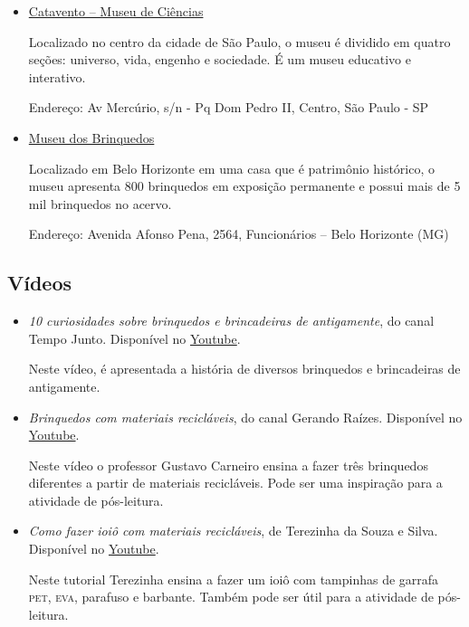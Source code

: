 \documentclass[11pt]{extarticle}
\begin{document}
\begin{itemize}

\item \href{https://museucatavento.org.br/}{Catavento – Museu de Ciências}

Localizado no centro da cidade de São Paulo, o museu é dividido em quatro seções: universo, vida, engenho e sociedade. É um museu educativo e interativo.

Endereço: Av Mercúrio, s/n - Pq Dom Pedro II, Centro, São Paulo - SP

\item \href{http://www.museudosbrinquedos.org.br/}{Museu dos Brinquedos}

Localizado em Belo Horizonte em uma casa que é patrimônio histórico, o museu apresenta 800 brinquedos em exposição permanente e possui mais de 5 mil brinquedos no acervo.

Endereço: Avenida Afonso Pena, 2564, Funcionários – Belo Horizonte (MG)

\end{itemize}

\subsection{Vídeos}

\begin{itemize}

\item \textit{10 curiosidades sobre brinquedos e brincadeiras de antigamente}, do canal Tempo Junto. Disponível no \href{https://www.youtube.com/watch?v=oGzmQm7RZGQ&ab_channel=Tempojunto}{Youtube}. 

Neste vídeo, é apresentada a história de diversos brinquedos e brincadeiras de antigamente.

\item \textit{Brinquedos com materiais recicláveis}, do canal Gerando Raízes. Disponível no \href{https://www.youtube.com/watch?v=qeNmZrRDfrw&ab_channel=GERANDORAIZES}{Youtube}. 

Neste vídeo o professor Gustavo Carneiro ensina a fazer três brinquedos diferentes a partir de materiais recicláveis. Pode ser uma inspiração para a atividade de pós-leitura.

\item \textit{Como fazer ioiô com materiais recicláveis}, de Terezinha da Souza e Silva. Disponível no \href{https://www.youtube.com/watch?v=iWO3JFAAvJc&ab_channel=TerezinhadeSouzadaSilva}{Youtube}. 

Neste tutorial Terezinha ensina a fazer um ioiô com tampinhas de garrafa \textsc{pet}, \textsc{eva}, parafuso e barbante. Também pode ser útil para a atividade de pós-leitura. 

\end{itemize}
\end{document}
